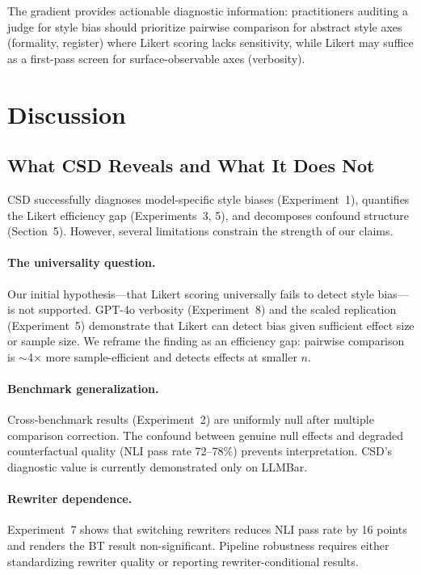 \documentclass[11pt,a4paper]{article}
\begin{document}
The gradient provides actionable diagnostic information: practitioners auditing a judge for style bias should prioritize pairwise comparison for abstract style axes (formality, register) where Likert scoring lacks sensitivity, while Likert may suffice as a first-pass screen for surface-observable axes (verbosity).

\section{Discussion}

\subsection{What CSD Reveals and What It Does Not}

CSD successfully diagnoses model-specific style biases (Experiment~1), quantifies the Likert efficiency gap (Experiments~3, 5), and decomposes confound structure (Section~5). However, several limitations constrain the strength of our claims.

\paragraph{The universality question.} Our initial hypothesis---that Likert scoring universally fails to detect style bias---is not supported. GPT-4o verbosity (Experiment~8) and the scaled replication (Experiment~5) demonstrate that Likert can detect bias given sufficient effect size or sample size. We reframe the finding as an efficiency gap: pairwise comparison is $\sim$4$\times$ more sample-efficient and detects effects at smaller $n$.

\paragraph{Benchmark generalization.} Cross-benchmark results (Experiment~2) are uniformly null after multiple comparison correction. The confound between genuine null effects and degraded counterfactual quality (NLI pass rate 72--78\%) prevents interpretation. CSD's diagnostic value is currently demonstrated only on LLMBar.

\paragraph{Rewriter dependence.} Experiment~7 shows that switching rewriters reduces NLI pass rate by 16 points and renders the BT result non-significant. Pipeline robustness requires either standardizing rewriter quality or reporting rewriter-conditional results.
\end{document}
